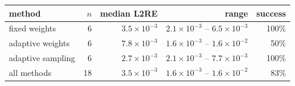 \begin{tabular}{lrrrr}
\toprule
method & $n$ & median L2RE & range & success \\
\midrule
fixed weights & 6 & $3.5\times10^{-3}$ & $2.1\times10^{-3}$ -- $6.5\times10^{-3}$ & 100\% \\
adaptive weights & 6 & $7.8\times10^{-3}$ & $1.6\times10^{-3}$ -- $1.6\times10^{-2}$ & 50\% \\
adaptive sampling & 6 & $2.7\times10^{-3}$ & $2.1\times10^{-3}$ -- $7.7\times10^{-3}$ & 100\% \\
\midrule
all methods & 18 & $3.5\times10^{-3}$ & $1.6\times10^{-3}$ -- $1.6\times10^{-2}$ & 83\% \\
\bottomrule
\end{tabular}